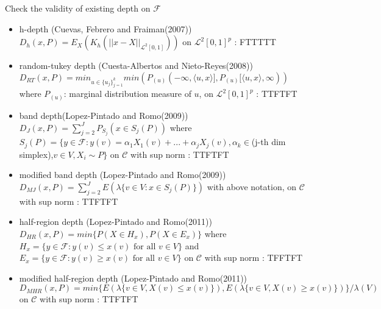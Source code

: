 \documentclass[aspectratio=169,ignorenonframetext,9pt]{beamer}
\theoremstyle{plain}
\theoremstyle{definition}
\begin{document}
\begin{frame}{Check the validity of existing depth on $\mathcal{F}$}
    \begin{itemize}
        \item h-depth (Cuevas, Febrero and Fraiman(2007)) \\
        $D_h(x,P)=E_X(K_h(||x-X||_{\mathcal{L}^2[0,1]}))$ on $\mathcal{L}^2[0,1]^p$ : FTTTTT
        \item random-tukey depth (Cuesta-Albertos and Nieto-Reyes(2008))
        $D_{RT}(x,P)=min_{u\in\{u_j\}_{j=1}^k}min(P_{(u)}(-\infty,\langle u,x \rangle], P_{(u)}[\langle u,x \rangle,\infty))$ \\
        where $P_{(u)}$: marginal distribution measure of $u$, on $\mathcal{L}^2[0,1]^p$ : TTFTFT
        \item band depth(Lopez-Pintado and Romo(2009)) \\
        $D_J(x,P)=\sum_{j=2}^J P_{S_j}(x\in S_j(P))$ where $S_j(P)=\{y\in\mathcal{F} : y(v)=\alpha_1X_1(v)+...+\alpha_jX_j(v), \alpha_k\in$(j-th dim simplex),$ v\in V, X_i\sim P\}$
        on $\mathcal{C}$ with sup norm : TTFTFT
        \item modified band depth (Lopez-Pintado and Romo(2009)) \\
        $D_{MJ}(x,P)=\sum_{j=2}^J E(\lambda \{v\in V : x\in S_j(P)\})$ with above notation,
        on $\mathcal{C}$ with sup norm : TTFTFT
        \item half-region depth (Lopez-Pintado and Romo(2011)) \\
        $D_{HR}(x,P)=min\{P(X\in H_x), P(X\in E_x)\}$ where $H_x=\{y\in\mathcal{F} : y(v)\leq x(v) \text{ for all } v\in V\}$ and 
        $E_x=\{y\in\mathcal{F} : y(v)\geq x(v) \text{ for all } v\in V\}$ on $\mathcal{C}$ with sup norm : TFFTFT
        \item modified half-region depth (Lopez-Pintado and Romo(2011)) \\
        $D_{MHR}(x,P)=min\{E(\lambda\{v\in V, X(v)\leq x(v)\}), E(\lambda\{v\in V, X(v)\geq x(v)\})\}/\lambda(V)$
        on $\mathcal{C}$ with sup norm : TTFTFT
    \end{itemize}

\end{frame}
\end{document}
